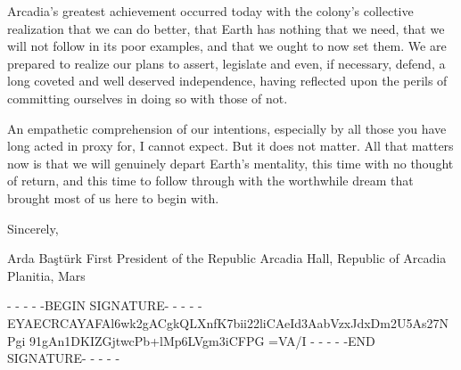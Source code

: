 Arcadia's greatest achievement occurred today with the colony's collective realization that we can do better, that Earth has nothing that we need, that we will not follow in its poor examples, and that we ought to now set them. We are prepared to realize our plans to assert, legislate and even, if necessary, defend, a long coveted and well deserved independence, having reflected upon the perils of committing ourselves in doing so with those of not. 

An empathetic comprehension of our intentions, especially by all those you have long acted in proxy for, I cannot expect. But it does not matter. All that matters now is that we will genuinely depart Earth's mentality, this time with no thought of return, and this time to follow through with the worthwhile dream that brought most of us here to begin with.

Sincerely, 

\hskip 1cm 
   
Arda Baştürk
First President of the Republic
Arcadia Hall, Republic of Arcadia Planitia, Mars

- - - - -BEGIN SIGNATURE- - - - -
EYAECRCAYAFAl6wk2gACgkQLXnfK7bii22liCAeId3AabVzxJdxDm2U5As27NPgi
91gAn1DKIZGjtwcPb+lMp6LVgm3iCFPG
=VA/I
- - - - -END SIGNATURE- - - - -
\stoplines

